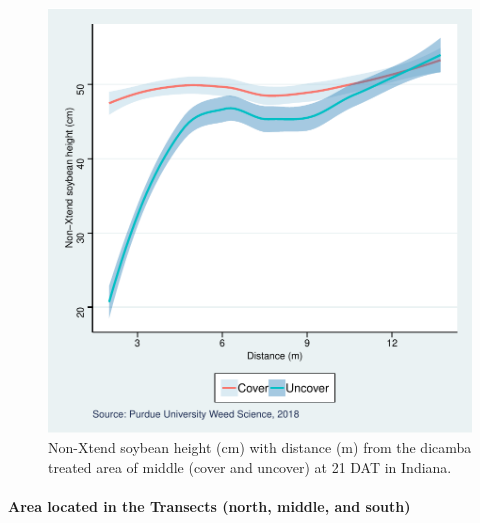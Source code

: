 \documentclass[]{article}
\let\oldparagraph\paragraph
\renewcommand{\paragraph}[1]{\oldparagraph{#1}\mbox{}}
\begin{document}
\begin{figure}
\centering
\includegraphics{Report_files/figure-latex/unnamed-chunk-41-1.pdf}
\caption{Non-Xtend soybean height (cm) with distance (m) from the
dicamba treated area of middle (cover and uncover) at 21 DAT in
Indiana.}
\end{figure}

\pagebreak
\newpage

\paragraph{\texorpdfstring{Area located in the \textbf{Transects}
(north, middle, and
south)}{Area located in the Transects (north, middle, and south)}}\label{area-located-in-the-transects-north-middle-and-south}
\end{document}

